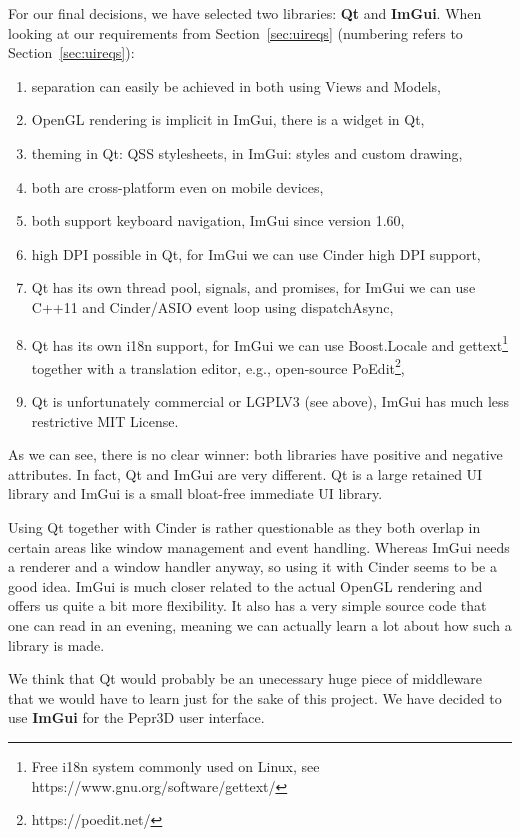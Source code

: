 For our final decisions, we have selected two libraries: \textbf{Qt} and \textbf{ImGui}.
When looking at our requirements from Section~\ref{sec:uireqs} (numbering refers to Section~\ref{sec:uireqs}):
%
\begin{enumerate}
\setlength\itemsep{0em}
\item separation can easily be achieved in both using Views and Models,
\item OpenGL rendering is implicit in ImGui, there is a widget in Qt,
\item theming in Qt: QSS stylesheets, in ImGui: styles and custom drawing,
\item both are cross-platform even on mobile devices,
\item both support keyboard navigation, ImGui since version 1.60,
\item high DPI possible in Qt, for ImGui we can use Cinder high DPI support,
\item Qt has its own thread pool, signals, and promises, for ImGui we can use C++11 and Cinder/ASIO event loop using dispatchAsync,
\item Qt has its own i18n support, for ImGui we can use Boost.Locale and gettext\footnote{Free i18n system commonly used on Linux, see https://www.gnu.org/software/gettext/} together with a translation editor, e.g., open-source PoEdit\footnote{https://poedit.net/},
\item Qt is unfortunately commercial or LGPLV3 (see above), ImGui has much less restrictive MIT License.
\end{enumerate}

As we can see, there is no clear winner: both libraries have positive and negative attributes.
In fact, Qt and ImGui are very different.
Qt is a large retained UI library and ImGui is a small bloat-free immediate UI library.

Using Qt together with Cinder is rather questionable as they both overlap in certain areas like window management and event handling.
Whereas ImGui needs a renderer and a window handler anyway, so using it with Cinder seems to be a good idea.
ImGui is much closer related to the actual OpenGL rendering and offers us quite a bit more flexibility.
It also has a very simple source code that one can read in an evening, meaning we can actually learn a lot about how such a library is made.

We think that Qt would probably be an unecessary huge piece of middleware that we would have to learn just for the sake of this project.
We have decided to use \textbf{ImGui} for the Pepr3D user interface.